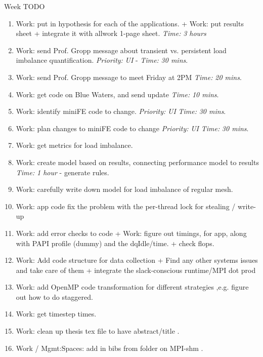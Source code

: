 \documentclass[serif, mathserif, final]{beamer}
\newcommand{\timeEst}[1]{\textit{Time:} \textit{#1}}
\newcommand{\priority}[1]{\textit{Priority:} \textit{#1}}
\begin{document}
\begin{frame}{}
\begin{columns}
\begin{column}{0.50\linewidth}
\begin{block}{ Week TODO} 

\begin{enumerate}

\item \tiny Work: put in hypothesis for each of the applications.  + Work: put results sheet  + integrate it with allwork 1-page sheet.  \timeEst{3 hours}
\item \tiny Work: send Prof. Gropp message about transient vs. persistent load imbalance quantification. \priority{UI} - \timeEst{30 mins}. 
\item \tiny Work: send Prof. Gropp message to meet Friday at 2PM \timeEst{20 mins}. 
\item \tiny Work: get code on Blue Waters, and send update \timeEst{10 mins}.  

\item \tiny Work: identify miniFE code to change.  \priority{UI} \timeEst{30 mins}. 
\item \tiny Work: plan changes to miniFE code to change \priority{UI} \timeEst{30 mins}. 

\item \tiny Work: get metrics for load imbalance. 
\item \tiny Work: create model based on results, connecting performance model to results \timeEst{1 hour} - generate rules. 
\item \tiny Work: carefully write down model for load imbalance of regular mesh. 

\item \tiny Work: app code fix the problem with the per-thread lock for stealing / write-up 
\item \tiny Work: add error checks to code + Work: figure out timings, for app, along with PAPI profile (dummy) and the dqIdle/time. + check flops. 
\item \tiny Work: Add code structure for data collection + Find any other systems issues and take care of them + integrate the slack-conscious runtime/MPI dot prod 
\item \tiny Work: add OpenMP code transformation for different strategies ,e.g. figure out how to do staggered. 
\item \tiny Work: get timestep times. 

\tiny \item \tiny Work: clean up thesis tex file to have abstract/title . 
\tiny \item \tiny Work / Mgmt:Spaces: add in bibs from folder on MPI-shm . 


\end{enumerate}
\end{block}
\end{column}
\end{columns}
\end{frame}
\end{document}
